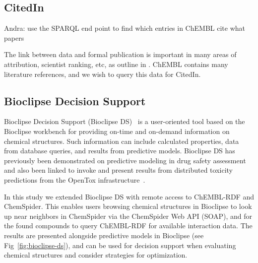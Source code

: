 \documentclass[10pt]{bmc_article}
\newenvironment{bmcformat}{\begin{raggedright}\baselineskip20pt\sloppy\setboolean{publ}{false}}{\end{raggedright}\baselineskip20pt\sloppy}
\begin{document}
\begin{bmcformat}
\subsection*{CitedIn}

Andra: use the SPARQL end point to find which entries in ChEMBL cite what papers
 
The link between data and formal publication is important in many areas of
attribution, scientist ranking, etc, as outline in \cite{Waagmeester2012}.
ChEMBL contains many literature references, and we wish to query this data
for CitedIn.

\subsection*{Bioclipse Decision Support}


Bioclipse Decision Support (Bioclipse DS)~\cite{Spjuth:2011uq} is a user-oriented tool based on the Bioclipse 
workbench for providing on-time and on-demand information on chemical structures. 
Such information can include calculated properties, data from database queries, 
and results from predictive models. Bioclipse DS has previously been demonstrated on predictive 
modeling in drug safety assessment~\cite{Spjuth:2011uq} and also been linked to invoke and 
present results from distributed toxicity predictions from the OpenTox infrastructure~\cite{Willighagen:2011kx}.

In this study we extended Bioclipse DS with remote access to ChEMBL-RDF and ChemSpider. 
This enables users browsing chemical structures in Bioclipse to look up near neighbors in ChemSpider 
via the ChemSpider Web API (SOAP), and for the found compounds to query ChEMBL-RDF for 
available interaction data. The results are presented alongside predictive models in Bioclipse
(see Fig~\ref{fig:bioclipse-ds}), and can be used for decision support when evaluating chemical
structures and consider strategies for optimization.


\end{bmcformat}
\end{document}
